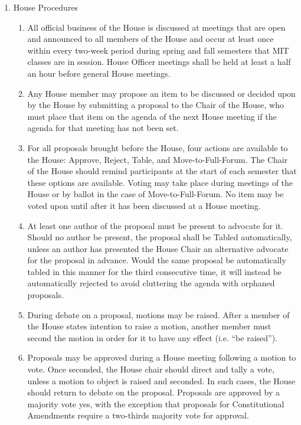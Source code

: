 \documentclass[letterpaper]{article}
\begin{document}
\begin{enumerate}
\begin{enumerate}
\begin{enumerate}
\end{enumerate}

\item House Procedures

\begin{enumerate}

\item All official business of the House is discussed at meetings that are open and announced to all members of the House and occur at least once within every two-week period during spring and fall semesters that MIT classes are in session. House Officer meetings shall be held at least a half an hour before general House meetings.

\item Any House member may propose an item to be discussed or decided upon by the House by submitting a proposal to the Chair of the House, who must place that item on the agenda of the next House meeting if the agenda for that meeting has not been set.

\item For all proposals brought before the House, four actions are available to the House: Approve, Reject, Table, and Move-to-Full-Forum. The Chair of the House should remind participants at the start of each semester that these options are available. Voting may take place during meetings of the House or by ballot in the case of Move-to-Full-Forum. No item may be voted upon until after it has been discussed at a House meeting.

\item At least one author of the proposal must be present to advocate for it. Should no author be present, the proposal shall be Tabled automatically, unless an author has presented the House Chair an alternative advocate for the proposal in advance. Would the same proposal be automatically tabled in this manner for the third consecutive time, it will instead be automatically rejected to avoid cluttering the agenda with orphaned proposals.

\item During debate on a proposal, motions may be raised. After a member of the House states intention to raise a motion, another member must second the motion in order for it to have any effect (i.e. ``be raised'').

\item Proposals may be approved during a House meeting following a motion to vote. Once seconded, the House chair should direct and tally a vote, unless a motion to object is raised and seconded. In such cases, the House should return to debate on the proposal. Proposals are approved by a majority vote yes, with the exception that proposals for Constitutional Amendments require a two-thirds majority vote for approval.


\end{enumerate}
\end{enumerate}
\end{enumerate}
\end{document}
